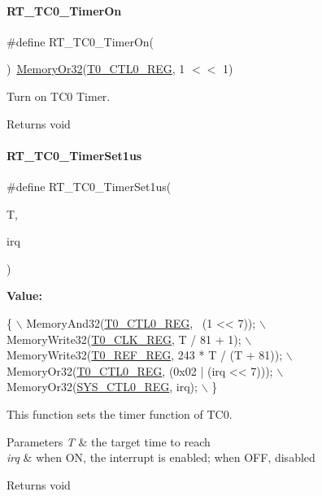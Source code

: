 \paragraph{\texorpdfstring{R\+T\+\_\+\+T\+C0\+\_\+\+Timer\+On}{RT\_TC0\_TimerOn}}
{\footnotesize\ttfamily \#define R\+T\+\_\+\+T\+C0\+\_\+\+Timer\+On(\begin{DoxyParamCaption}{ }\end{DoxyParamCaption})~\mbox{\hyperlink{a00026_a27874a97deab7cecdde5ddecf466e31e}{Memory\+Or32}}(\mbox{\hyperlink{a00026_ac94b0659ef32086a6752672082c0b3ed}{T0\+\_\+\+C\+T\+L0\+\_\+\+R\+EG}}, 1 $<$$<$ 1)}



Turn on T\+C0 Timer. 

\begin{DoxyReturn}{Returns}
void 
\end{DoxyReturn}
\mbox{\label{a00077_af8994aa8faed7529c93c25df30c020eb}} 
\paragraph{\texorpdfstring{R\+T\+\_\+\+T\+C0\+\_\+\+Timer\+Set1us}{RT\_TC0\_TimerSet1us}}
{\footnotesize\ttfamily \#define R\+T\+\_\+\+T\+C0\+\_\+\+Timer\+Set1us(\begin{DoxyParamCaption}\item[{}]{T,  }\item[{}]{irq }\end{DoxyParamCaption})}

{\bfseries Value\+:}
\begin{DoxyCode}
\{                                                  \(\backslash\)
        MemoryAnd32(\mbox{\hyperlink{a00026_ac94b0659ef32086a6752672082c0b3ed}{T0\_CTL0\_REG}}, ~(1 << 7));           \(\backslash\)
        MemoryWrite32(\mbox{\hyperlink{a00026_a02a329d71e5fe86e9a0a8513ea5e1630}{T0\_CLK\_REG}}, T / 81 + 1);         \(\backslash\)
        MemoryWrite32(\mbox{\hyperlink{a00026_a857679d0d1c771053cac56dc76c38caa}{T0\_REF\_REG}}, 243 * T / (T + 81)); \(\backslash\)
        MemoryOr32(\mbox{\hyperlink{a00026_ac94b0659ef32086a6752672082c0b3ed}{T0\_CTL0\_REG}}, (0x02 | (irq << 7)));  \(\backslash\)
        MemoryOr32(\mbox{\hyperlink{a00026_ab34acec79daf4fcc12a662cde9e75df7}{SYS\_CTL0\_REG}}, irq);                 \(\backslash\)
    \}
\end{DoxyCode}


This function sets the timer function of T\+C0. 


\begin{DoxyParams}{Parameters}
{\em T} & the target time to reach \\
\hline
{\em irq} & when ON, the interrupt is enabled; when O\+FF, disabled \\
\hline
\end{DoxyParams}
\begin{DoxyReturn}{Returns}
void 
\end{DoxyReturn}
